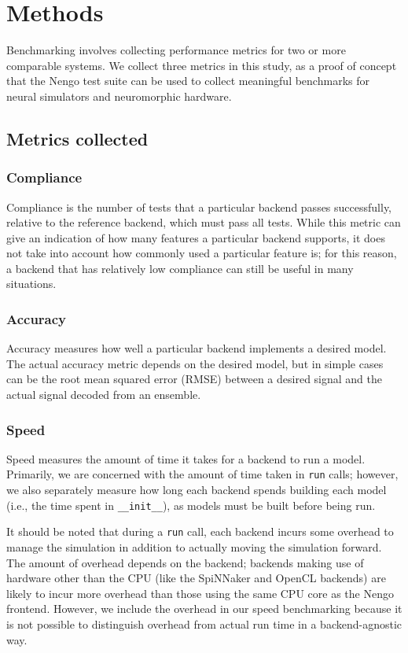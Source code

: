 \documentclass{frontiersSCNS}
\begin{document}
\section{Methods}

Benchmarking involves collecting performance metrics
for two or more comparable systems.
We collect three metrics in this study,
as a proof of concept that the Nengo test suite
can be used to collect meaningful benchmarks
for neural simulators and neuromorphic hardware.

\subsection{Metrics collected}
\label{Sec:Metrics}

\subsubsection{Compliance}

Compliance is the number of tests that a particular backend
passes successfully, relative to the reference
backend, which must pass all tests.
While this metric can give an indication
of how many features a particular backend supports,
it does not take into account how commonly used
a particular feature is;
for this reason, a backend that has relatively
low compliance can still be useful
in many situations.

\subsubsection{Accuracy}

Accuracy measures how well a particular backend
implements a desired model.
The actual accuracy metric depends
on the desired model,
but in simple cases can be
the root mean squared error (RMSE)
between a desired signal
and the actual signal decoded
from an ensemble.

\subsubsection{Speed}

Speed measures the amount of time it takes
for a backend to run a model.
Primarily, we are concerned with
the amount of time taken
in \texttt{run} calls;
however, we also separately measure how long
each backend spends building each model
(i.e., the time spent in \texttt{\_\_init\_\_}),
as models must be built before being run.

It should be noted that
during a \texttt{run} call,
each backend incurs some overhead
to manage the simulation in addition
to actually moving the simulation forward.
The amount of overhead depends
on the backend; backends making use
of hardware other than the CPU
(like the SpiNNaker and OpenCL backends)
are likely to incur more overhead
than those using the same CPU core
as the Nengo frontend.
However, we include the overhead in
our speed benchmarking because
it is not possible to distinguish
overhead from actual run time
in a backend-agnostic way.
\end{document}
